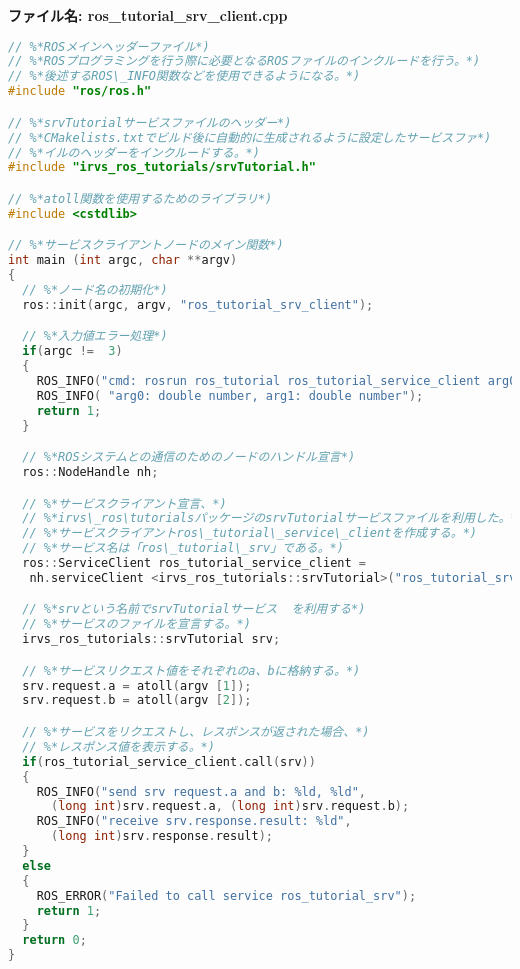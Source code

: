 \noindent\textbf{ファイル名: ros\_tutorial\_srv\_client.cpp}
\begin{lstlisting}[language=C++]
// %*ROSメインヘッダーファイル*)
// %*ROSプログラミングを行う際に必要となるROSファイルのインクルードを行う。*)
// %*後述するROS\_INFO関数などを使用できるようになる。*)
#include "ros/ros.h"

// %*srvTutorialサービスファイルのヘッダー*)
// %*CMakelists.txtでビルド後に自動的に生成されるように設定したサービスファ*)
// %*イルのヘッダーをインクルードする。*)
#include "irvs_ros_tutorials/srvTutorial.h"

// %*atoll関数を使用するためのライブラリ*)
#include <cstdlib>

// %*サービスクライアントノードのメイン関数*)
int main (int argc, char **argv)
{
  // %*ノード名の初期化*)
  ros::init(argc, argv, "ros_tutorial_srv_client");

  // %*入力値エラー処理*)
  if(argc !=  3)
  {
    ROS_INFO("cmd: rosrun ros_tutorial ros_tutorial_service_client arg0 arg1");
    ROS_INFO( "arg0: double number, arg1: double number");
    return 1;
  }

  // %*ROSシステムとの通信のためのノードのハンドル宣言*)
  ros::NodeHandle nh;

  // %*サービスクライアント宣言、*)
  // %*irvs\_ros\tutorialsパッケージのsrvTutorialサービスファイルを利用した。*)
  // %*サービスクライアントros\_tutorial\_service\_clientを作成する。*)
  // %*サービス名は「ros\_tutorial\_srv」である。*)
  ros::ServiceClient ros_tutorial_service_client =
   nh.serviceClient <irvs_ros_tutorials::srvTutorial>("ros_tutorial_srv");

  // %*srvという名前でsrvTutorialサービス  を利用する*)
  // %*サービスのファイルを宣言する。*)
  irvs_ros_tutorials::srvTutorial srv;

  // %*サービスリクエスト値をそれぞれのa、bに格納する。*)
  srv.request.a = atoll(argv [1]);
  srv.request.b = atoll(argv [2]);

  // %*サービスをリクエストし、レスポンスが返された場合、*)
  // %*レスポンス値を表示する。*)
  if(ros_tutorial_service_client.call(srv))
  {
    ROS_INFO("send srv request.a and b: %ld, %ld",
      (long int)srv.request.a, (long int)srv.request.b);
    ROS_INFO("receive srv.response.result: %ld",
      (long int)srv.response.result);
  }
  else
  {
    ROS_ERROR("Failed to call service ros_tutorial_srv");
    return 1;
  }
  return 0;
}
\end{lstlisting}

